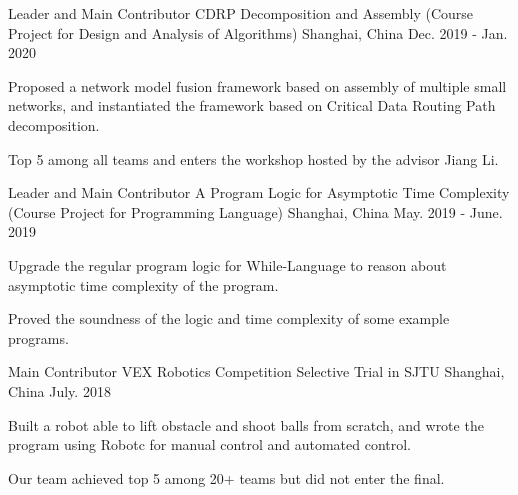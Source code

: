 

\begin{cventries}

  \cventry
    {Leader and Main Contributor} %
    {CDRP Decomposition and Assembly (Course Project for Design and Analysis of Algorithms)} %
    {Shanghai, China} %
    {Dec. 2019 - Jan. 2020} %
    {
      \begin{cvitems} %
        \item {Proposed a network model fusion framework based on assembly of multiple small networks, and instantiated the framework based on Critical Data Routing Path decomposition.}
        \item {Top 5 among all teams and enters the workshop hosted by the advisor Jiang Li.}
      \end{cvitems}
    }

  \cventry
    {Leader and Main Contributor} %
    {A Program Logic for Asymptotic Time Complexity (Course Project for Programming Language)} %
    {Shanghai, China} %
    {May. 2019 - June. 2019} %
    {
      \begin{cvitems} %
        \item {Upgrade the regular program logic for While-Language to reason about asymptotic time complexity of the program.}
        \item {Proved the soundness of the logic and time complexity of some example programs.}
      \end{cvitems}
    }

  \cventry
  {Main Contributor} %
  {VEX Robotics Competition Selective Trial in SJTU} %
  {Shanghai, China} %
  {July. 2018} %
  {
    \begin{cvitems} %
      \item {Built a robot able to lift obstacle and shoot balls from scratch, and wrote the program using Robotc for manual control and automated control.}
      \item {Our team achieved top 5 among 20+ teams but did not enter the final.}
    \end{cvitems}
  }

\end{cventries}

